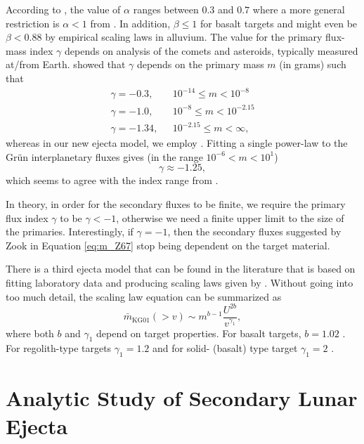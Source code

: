\documentclass{hitec}
\numberwithin{equation}{section}
\begin{document}
According to \cite{zook1967problem}, the value of $\alpha$ ranges between $0.3$ and $0.7$ where a more general restriction is $\alpha < 1$ from \cite{gault1963spray}. In addition, $\beta \le 1$ \citep{gault1963spray} for basalt targets and might even be $\beta < 0.88$ by empirical scaling laws in alluvium. The value for the primary flux-mass index $\gamma$ depends on analysis of the comets and asteroids, typically measured at/from Earth. \cite{zook1967problem} showed that $\gamma$ depends on the primary mass $m$ (in grams) such that
\begin{align}
\gamma = -0.3, \text{  }& 10^{-14} \le m < 10^{-8}\\\nonumber
\gamma = -1.0, \text{  }& 10^{-8} \le m < 10^{-2.15} \nonumber\\
\gamma = -1.34, \text{  }& 10^{-2.15} \le m < \infty, \nonumber
\end{align}
whereas in our new ejecta model, we employ \cite{grun1985collisional}. Fitting a single power-law to the Gr{\"u}n interplanetary fluxes gives (in the range $10^{-6} < m < 10^{1}$)
\begin{equation}
\gamma \approx -1.25,
\end{equation}
which seems to agree with the index range from \cite{zook1967problem}.

In theory, in order for the secondary fluxes to be finite, we require the primary flux index $\gamma$ to be $\gamma < -1$, otherwise we need a finite upper limit to the size of the primaries. Interestingly, if $\gamma = -1$, then the secondary fluxes suggested by Zook in Equation \eqref{eq:m_Z67} stop being dependent on the target material.

There is a third ejecta model that can be found in the literature that is based on fitting laboratory data and producing scaling laws given by \cite{koschny2001impacts}. Without going into too much detail, the scaling law equation can be summarized as
\begin{equation}
\bar{m}_{\text{KG01}}(>v) \sim m^{b-1}\frac{U^{2b}}{v^{\gamma_{1}}},
\end{equation}
where both $b$ and $\gamma_1$ depend on target properties. For basalt targets, $b=1.02$ \citep{moore1963experimental}. For regolith-type targets $\gamma_1 = 1.2$ and for solid- (basalt) type target $\gamma_1 = 2$ \citep{krivov2003impact}.

\section{Analytic Study of Secondary Lunar Ejecta}
\label{sec:AnalyticStudyofSecondaryLunarEjecta}
\end{document}
